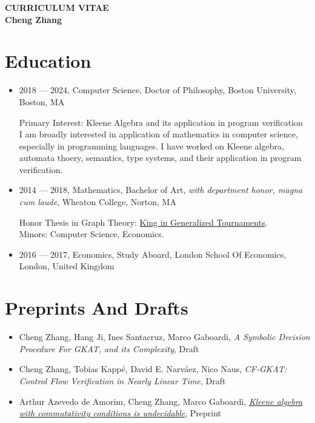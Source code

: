 \hypersetup{ urlcolor=black,linkcolor=black }

\begin{center}
{\LARGE {\bf CURRICULUM VITAE}}\\
\vspace{0.5in}
{\large {\bf Cheng Zhang}}
\end{center}

\section*{Education}

\begin{itemize}
    \item 
    2018 --- 2024, Computer Science, Doctor of Philosophy, Boston University, Boston, MA

    Primary Interest: Kleene Algebra and its application in program verification\\
    I am broadly interested in application of mathematics in computer science,
    especially in programming languages.
    I have worked on Kleene algebra, automata thoery, semantics, type systems, and their application in program verification.

    \item 2014 --- 2018, Mathematics, Bachelor of Art, \emph{with department honor, magna cum laude}, Wheaton College, Norton, MA

    Honor Thesis in Graph Theory: \href{http://hdl.handle.net/11040/24570}{King in Generalized Tournaments}.\\
    Minors: Computer Science, Economics.

    \item
    2016 --- 2017, Economics, Study Aboard, London School Of Economics, London, United Kingdom
\end{itemize}

\section*{Preprints And Drafts}

\begin{itemize}
    \item 
    Cheng Zhang, Hang Ji, Ines Santacruz, Marco Gaboardi, 
    \emph{A Symbolic Decision Procedure For GKAT, and its Complexity}, Draft

    \item 
    Cheng Zhang, Tobias Kappé, David E. Narváez, Nico Naus,
    \emph{CF-GKAT: Control Flow Verification in Nearly Linear Time}, Draft

    \item 
    Arthur Azevedo de Amorim, Cheng Zhang, Marco Gaboardi,
    \emph{\href{https://hal.science/hal-04534715/}{Kleene algebra with commutativity conditions is undecidable}}, Preprint
\end{itemize}

